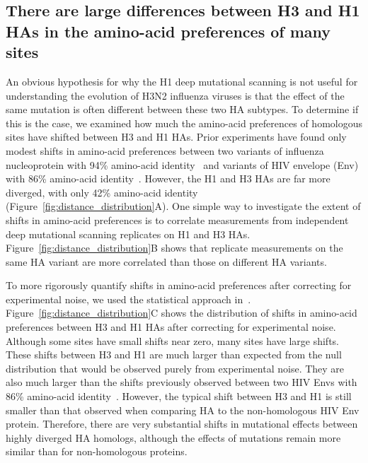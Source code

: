 \documentclass[9pt,twocolumn,twoside]{pnas-new-for-biorxiv}
\begin{document}
\subsection*{There are large differences between H3 and H1 HAs in the amino-acid preferences of many sites}
An obvious hypothesis for why the H1 deep mutational scanning is not useful for understanding the evolution of H3N2 influenza viruses is that the effect of the same mutation is often different between these two HA subtypes.
To determine if this is the case, we examined how much the amino-acid preferences of homologous sites have shifted between H3 and H1 HAs.
Prior experiments have found only modest shifts in amino-acid preferences between two variants of influenza nucleoprotein with 94\% amino-acid identity~\cite{doud2015site} and variants of HIV envelope (Env) with 86\% amino-acid identity~\cite{haddox2018mapping}.
However, the H1 and H3 HAs are far more diverged, with only 42\% amino-acid identity (Figure~\ref{fig:distance_distribution}A).
One simple way to investigate the extent of shifts in amino-acid preferences is to correlate measurements from independent deep mutational scanning replicates on H1 and H3 HAs.
Figure~\ref{fig:distance_distribution}B shows that replicate measurements on the same HA variant are more correlated than those on different HA variants.

To more rigorously quantify shifts in amino-acid preferences after correcting for experimental noise, we used the statistical approach in~\cite{doud2015site,haddox2018mapping}.
Figure~\ref{fig:distance_distribution}C shows the distribution of shifts in amino-acid preferences between H3 and H1 HAs after correcting for experimental noise.
Although some sites have small shifts near zero, many sites have large shifts.
These shifts between H3 and H1 are much larger than expected from the null distribution that would be observed purely from experimental noise.
They are also much larger than the shifts previously observed between two HIV Envs with 86\% amino-acid identity~\cite{haddox2018mapping}.
However, the typical shift between H3 and H1 is still smaller than that observed when comparing HA to the non-homologous HIV Env protein.
Therefore, there are very substantial shifts in mutational effects between highly diverged HA homologs, although the effects of mutations remain more similar than for non-homologous proteins.
\end{document}
